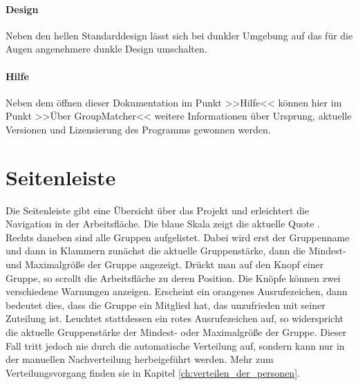 \paragraph{Design} Neben den hellen Standarddesign lässt sich bei dunkler Umgebung auf das für die Augen angenehmere dunkle Design umschalten.

\paragraph{Hilfe} Neben dem öffnen dieser Dokumentation im Punkt >>Hilfe<< können hier im Punkt >>Über GroupMatcher<< weitere Informationen über Ursprung, aktuelle Versionen und Lizensierung des Programms gewonnen werden.

\section{Seitenleiste}
\label{sec:seitenleiste}

Die Seitenleiste gibt eine Übersicht über das Projekt und erleichtert die Navigation in der Arbeitsfläche. Die blaue Skala zeigt die aktuelle Quote .\\
Rechts daneben sind alle Gruppen aufgelistet. Dabei wird erst der Gruppenname und dann in Klammern zunächst die aktuelle Gruppenstärke, dann die Mindest- und Maximalgröße der Gruppe angezeigt. Drückt man auf den Knopf einer Gruppe, so scrollt die Arbeitsfläche zu deren Position. Die Knöpfe können zwei verschiedene Warnungen anzeigen. Erscheint ein orangenes Ausrufezeichen, dann bedeutet dies, dass die Gruppe ein Mitglied hat, das unzufrieden  mit seiner Zuteilung ist. Leuchtet stattdessen ein rotes Ausrufezeichen auf, so widerspricht die aktuelle Gruppenstärke der Mindest- oder Maximalgröße der Gruppe. Dieser Fall tritt jedoch nie durch die automatische Verteilung auf, sondern kann nur in der manuellen Nachverteilung herbeigeführt werden. Mehr zum Verteilungsvorgang finden sie in Kapitel \ref{ch:verteilen_der_personen}.
